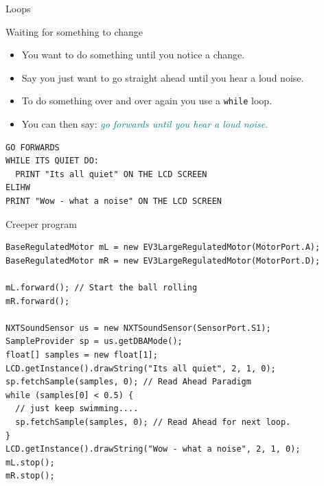 \documentclass[color=pdftex,usenames,dvipsnames, aspectratio=169]{beamer}
\begin{document}
\begin{frame}[fragile,label=creeperPDL]{Loops}
\begin{block}{Waiting for something to change}
\begin{itemize}
\item \textcolor{OliveGreen}{You want to do something until you notice a change.}
\item Say you just want to go straight ahead until you hear a loud noise.
\item To do something over and over again you use a \lstinline!while! loop.
\item You can then say: \textcolor{teal}{\emph{go forwards until you hear a loud noise}.}
\end{itemize}
\end{block}

\begin{lstlisting}[emph={WHILE,ELIHW,DO},linewidth=12cm]
GO FORWARDS
WHILE ITS QUIET DO:
  PRINT "Its all quiet" ON THE LCD SCREEN
ELIHW
PRINT "Wow - what a noise" ON THE LCD SCREEN
\end{lstlisting}
\end{frame}
\begin{frame}[fragile]{Creeper program}
\begin{lstlisting}[linewidth=12cm,basicstyle=\ttfamily\scriptsize\color{blue},emph={samples,sp,us}]
BaseRegulatedMotor mL = new EV3LargeRegulatedMotor(MotorPort.A);
BaseRegulatedMotor mR = new EV3LargeRegulatedMotor(MotorPort.D);

mL.forward(); // Start the ball rolling
mR.forward();

NXTSoundSensor us = new NXTSoundSensor(SensorPort.S1);
SampleProvider sp = us.getDBAMode();
float[] samples = new float[1];
LCD.getInstance().drawString("Its all quiet", 2, 1, 0);
sp.fetchSample(samples, 0); // Read Ahead Paradigm
while (samples[0] < 0.5) {
  // just keep swimming....
  sp.fetchSample(samples, 0); // Read Ahead for next loop.
}
LCD.getInstance().drawString("Wow - what a noise", 2, 1, 0);
mL.stop();
mR.stop();
\end{lstlisting}

\end{frame}
\end{document}
